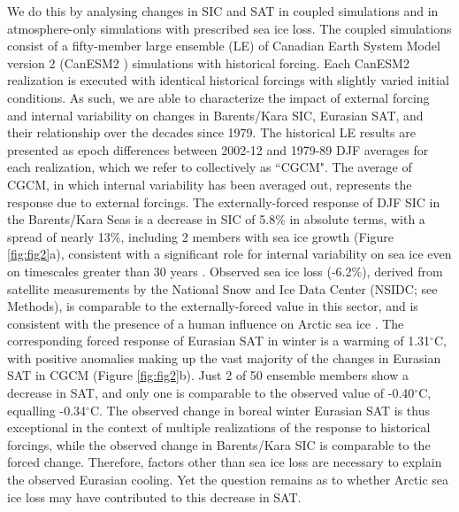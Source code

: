 \documentclass{nature}
\begin{document}
We do this by analysing changes in SIC and SAT in coupled simulations and in atmosphere-only simulations with prescribed sea ice loss. The coupled simulations consist of a fifty-member large ensemble (LE) of Canadian Earth System Model version 2 (CanESM2 \cite{arora11}) simulations with historical forcing. Each CanESM2 realization is executed with identical historical forcings with slightly varied initial conditions. As such, we are able to characterize the impact of external forcing and internal variability on changes in Barents/Kara SIC, Eurasian SAT, and their relationship over the decades since 1979. The historical LE results are presented as epoch differences between 2002-12 and 1979-89 DJF averages for each realization, which we refer to collectively as ``CGCM". The average of CGCM, in which internal variability has been averaged out, represents the response due to external forcings. The externally-forced response of DJF SIC in the Barents/Kara Seas is a decrease in SIC of 5.8\% in absolute terms, with a spread of nearly 13\%, including 2 members with sea ice growth (Figure \ref{fig:fig2}a), consistent with a significant role for internal variability on sea ice even on timescales greater than 30 years \cite{swart15}. Observed sea ice loss (-6.2\%), derived from satellite measurements by the National Snow and Ice Data Center (NSIDC; see Methods), is comparable to the externally-forced value in this sector, and is consistent with the presence of a human influence on Arctic sea ice \cite{min08}. The corresponding forced response of Eurasian SAT in winter is a warming of 1.31$^\circ$C, with positive anomalies making up the vast majority of the changes in Eurasian SAT in CGCM (Figure \ref{fig:fig2}b). Just 2 of 50 ensemble members show a decrease in SAT, and only one is comparable to the observed value of -0.40$^\circ$C, equalling -0.34$^\circ$C. The observed change in boreal winter Eurasian SAT is thus exceptional in the context of multiple realizations of the response to historical forcings, while the observed change in Barents/Kara SIC is comparable to the forced change. Therefore, factors other than sea ice loss are necessary to explain the observed Eurasian cooling. Yet the question remains as to whether Arctic sea ice loss may have contributed to this decrease in SAT.

\end{document}
